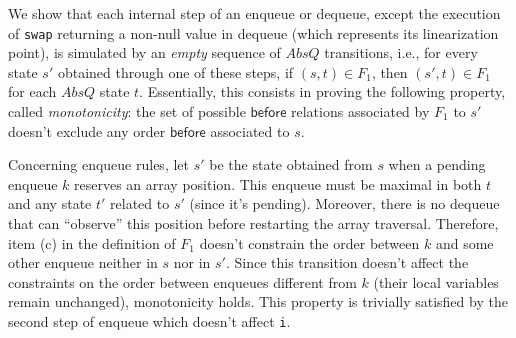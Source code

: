 We show that each internal step of an enqueue or dequeue, except the execution of {\tt swap} returning a non-null value in dequeue (which represents its linearization point), is simulated by an \emph{empty} sequence of $AbsQ$ transitions, i.e., for every state $s'$ obtained through one of these steps, if $(s,t)\in F_1$, then $(s',t)\in F_1$ for each $AbsQ$ state $t$.
Essentially, this consists in proving the following property, called \emph{monotonicity}: the set of possible $\mathsf{before}$ relations associated by $F_1$ to $s'$ doesn't exclude any order $\mathsf{before}$ associated to $s$.

Concerning enqueue rules, let $s'$ be the state obtained from $s$ when a pending enqueue $k$ reserves an array position. This enqueue must be maximal in both $t$ and any state $t'$ related to $s'$ (since it's pending). Moreover, there is no dequeue that can ``observe'' this position before restarting the array traversal. Therefore, item (c) in the definition of $F_1$ doesn't constrain the order between $k$ and some other enqueue neither in $s$ nor in $s'$. Since this transition doesn't affect the constraints on the order between enqueues different from $k$ (their local variables remain unchanged), monotonicity holds. This property is trivially satisfied by the second step of enqueue which doesn't affect {\tt i}.

